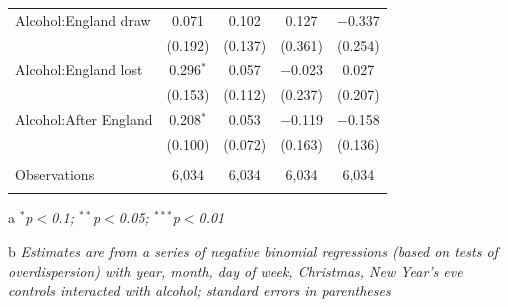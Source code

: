 \documentclass[12pt, letterpaper]{article}
\begin{document}
\begin{table}[ht]
{\begin{threeparttable}
\begin{tabular}{@{\extracolsep{5pt}}lcccc}
  Alcohol:England draw & 0.071 & 0.102 & 0.127 & $-$0.337 \\ 
  & (0.192) & (0.137) & (0.361) & (0.254) \\ 
  Alcohol:England lost & 0.296$^{*}$ & 0.057 & $-$0.023 & 0.027 \\ 
  & (0.153) & (0.112) & (0.237) & (0.207) \\ 
  Alcohol:After England & 0.208$^{*}$ & 0.053 & $-$0.119 & $-$0.158 \\ 
  & (0.100) & (0.072) & (0.163) & (0.136) \\ 
 \hline \\[-1.8ex] 
Observations & 6,034 & 6,034 & 6,034 & 6,034 \\ 
\hline 
\hline \\[-1.8ex] 
\end{tabular} 
\begin{tablenotes}
     \item[a] \textit{$^{*}$p$<$0.1; $^{**}$p$<$0.05; $^{***}$p$<$0.01}
      \item[b] \textit{Estimates are from a series of negative binomial regressions (based on tests of overdispersion)  with year, month, day of week, Christmas, New Year's eve controls interacted with alcohol; standard errors in parentheses}
    \end{tablenotes}
\end{threeparttable} }
\end{table}

\newpage
\end{document}
